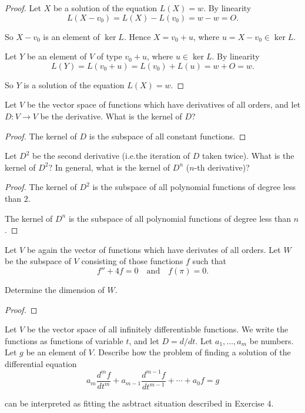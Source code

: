 \begin{proof}
    Let $X$ be a solution of the equation $L(X) = w$. By linearity
    \[
        L(X - v_{0}) = L(X) - L(v_{0}) = w - w = O.
    \]

    So $X - v_{0}$ is an element of $\ker L$. Hence $X = v_{0} + u$, where $u = X - v_{0} \in \ker L$.

    Let $Y$ be an element of $V$ of type $v_{0} + u$, where $u\in\ker L$. By linearity
    \[
        L(Y) = L(v_{0} + u) = L(v_{0}) + L(u) = w + O = w.
    \]

    So $Y$ is a solution of the equation $L(X) = w$.
\end{proof}

\begin{exercise}
    Let $V$ be the vector space of functions which have derivatives of all orders, and let $D: V \to V$ be the derivative. What is the kernel of $D$?
\end{exercise}

\begin{proof}
    The kernel of $D$ is the subspace of all constant functions.
\end{proof}

\begin{exercise}
    Let $D^{2}$ be the second derivative (i.e.\@ the iteration of $D$ taken twice). What is the kernel of $D^{2}$? In general, what is the kernel of $D^{n}$ ($n$-th derivative)?
\end{exercise}

\begin{proof}
    The kernel of $D^{2}$ is the subspace of all polynomial functions of degree less than $2$.

    The kernel of $D^{n}$ is the subspace of all polynomial functions of degree less than $n$.
\end{proof}

\begin{exercise}
    Let $V$ be again the vector of functions which have derivates of all orders. Let $W$ be the subspace of $V$ consisting of those functions $f$ such that
    \[
        f'' + 4f = 0 \quad\text{and}\quad f(\pi) = 0.
    \]

    Determine the dimension of $W$.
\end{exercise}

\begin{proof}
\end{proof}

\begin{exercise}
    Let $V$ be the vector space of all infinitely differentiable functions. We write the functions as functions of variable $t$, and let $D = d/dt$. Let $a_{1}, \ldots, a_{m}$ be numbers. Let $g$ be an element of $V$. Describe how the problem of finding a solution of the differential equation
    \[
        a_{m}\frac{d^{m}f}{dt^{m}} + a_{m-1}\frac{d^{m-1}f}{dt^{m-1}} + \cdots + a_{0}f = g
    \]

    can be interpreted as fitting the asbtract situation described in Exercise 4.
\end{exercise}

